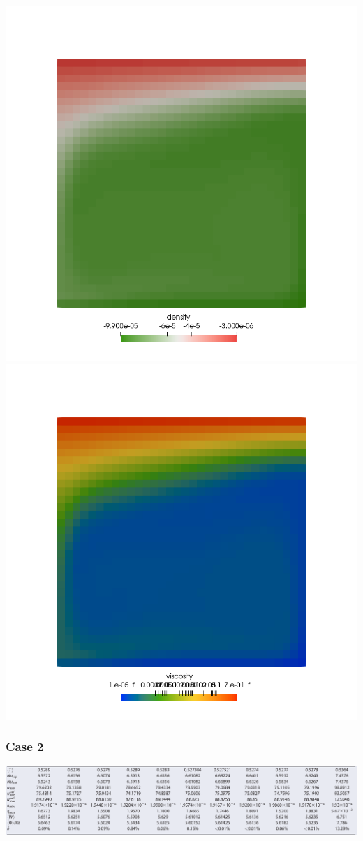 \begin{center}
\includegraphics[width=7.cm]{python_codes/fieldstone_28/results_case1/rho}
\includegraphics[width=7.cm]{python_codes/fieldstone_28/results_case1/mueff}
\end{center}









\newpage %
\subsubsection{Case 2}

\includegraphics[width=16cm]{python_codes/fieldstone_28/results_case4/tosn15}

